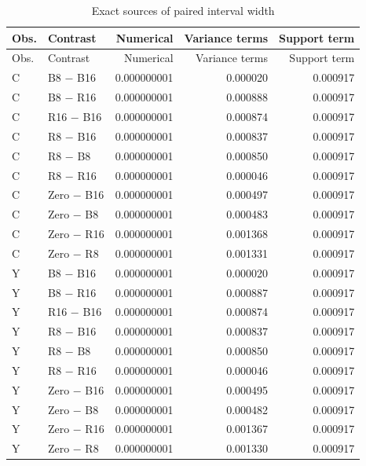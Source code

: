 {\small\setlength{\tabcolsep}{4pt}
\begin{longtable}{llrrr}
\caption{Exact sources of paired interval width}\label{tab:width77}\\
\toprule
Obs. & Contrast & Numerical & Variance terms & Support term \\
\midrule\endfirsthead
\toprule
Obs. & Contrast & Numerical & Variance terms & Support term \\
\midrule\endhead
C & B8 $-$ B16 & 0.000000001 & 0.000020 & 0.000917 \\
C & B8 $-$ R16 & 0.000000001 & 0.000888 & 0.000917 \\
C & R16 $-$ B16 & 0.000000001 & 0.000874 & 0.000917 \\
C & R8 $-$ B16 & 0.000000001 & 0.000837 & 0.000917 \\
C & R8 $-$ B8 & 0.000000001 & 0.000850 & 0.000917 \\
C & R8 $-$ R16 & 0.000000001 & 0.000046 & 0.000917 \\
C & Zero $-$ B16 & 0.000000001 & 0.000497 & 0.000917 \\
C & Zero $-$ B8 & 0.000000001 & 0.000483 & 0.000917 \\
C & Zero $-$ R16 & 0.000000001 & 0.001368 & 0.000917 \\
C & Zero $-$ R8 & 0.000000001 & 0.001331 & 0.000917 \\
Y & B8 $-$ B16 & 0.000000001 & 0.000020 & 0.000917 \\
Y & B8 $-$ R16 & 0.000000001 & 0.000887 & 0.000917 \\
Y & R16 $-$ B16 & 0.000000001 & 0.000874 & 0.000917 \\
Y & R8 $-$ B16 & 0.000000001 & 0.000837 & 0.000917 \\
Y & R8 $-$ B8 & 0.000000001 & 0.000850 & 0.000917 \\
Y & R8 $-$ R16 & 0.000000001 & 0.000046 & 0.000917 \\
Y & Zero $-$ B16 & 0.000000001 & 0.000495 & 0.000917 \\
Y & Zero $-$ B8 & 0.000000001 & 0.000482 & 0.000917 \\
Y & Zero $-$ R16 & 0.000000001 & 0.001367 & 0.000917 \\
Y & Zero $-$ R8 & 0.000000001 & 0.001330 & 0.000917 \\
\bottomrule\end{longtable}}
